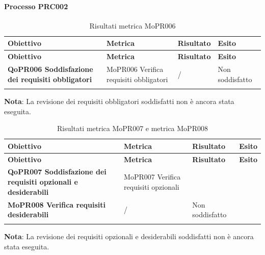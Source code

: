 \documentclass[../piano-di-qualifica.tex]{subfiles}
\begin{document}
\paragraph{Processo PRC002}
\label{sub:processo_PRC002}

\renewcommand{\arraystretch}{2} %
\begin{longtable}[H]{>{\centering\bfseries}m{5cm} >{\centering}m{5cm} >{\centering}m{2.5cm} >{\centering\arraybackslash}m{2.5cm}}  
  \rowcolor{lightgray}
  {\textbf{Obiettivo}} & {\textbf{Metrica}} & {\textbf{Risultato}} & {\textbf{Esito}}  \\
  \endfirsthead%
  \rowcolor{lightgray}
  {\textbf{Obiettivo}} & {\textbf{Metrica}} & {\textbf{Risultato}} & {\textbf{Esito}}  \\
  \endhead%
  \textbf{QoPR006 Soddisfazione dei requisiti obbligatori} & MoPR006 Verifica requisiti obbligatori & / & Non soddisfatto \\
  \caption{Risultati metrica MoPR006}
  \label{tab:my-table}
\end{longtable}
\textbf{Nota}: La revisione dei requisiti obbligatori soddisfatti non è ancora stata eseguita.

\renewcommand{\arraystretch}{2} %
\begin{longtable}[H]{>{\centering\bfseries}m{5cm} >{\centering}m{5cm} >{\centering}m{2.5cm} >{\centering\arraybackslash}m{2.5cm}}  
  \rowcolor{lightgray}
  {\textbf{Obiettivo}} & {\textbf{Metrica}} & {\textbf{Risultato}} & {\textbf{Esito}}  \\
  \endfirsthead%
  \rowcolor{lightgray}
  {\textbf{Obiettivo}} & {\textbf{Metrica}} & {\textbf{Risultato}} & {\textbf{Esito}}  \\
  \endhead%
  \textbf{QoPR007 Soddisfazione dei requisiti opzionali e desiderabili} & MoPR007 Verifica requisiti opzionali \\ MoPR008 Verifica requisiti desiderabili & / & Non soddisfatto \\
  \caption{Risultati metrica MoPR007 e metrica MoPR008}
  \label{tab:my-table}
\end{longtable}
\textbf{Nota}: La revisione dei requisiti opzionali e desiderabili soddisfatti non è ancora stata eseguita.
\end{document}
